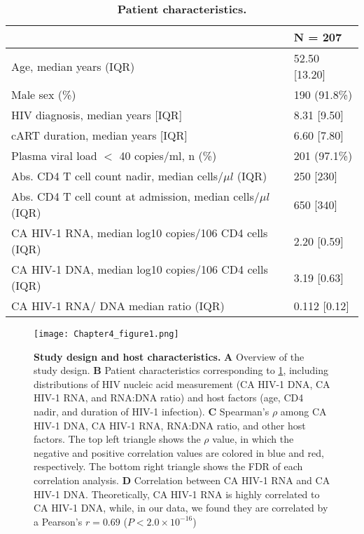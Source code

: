 \documentclass{book}
\begin{document}
\begin{refsection}
\begin{table}
  \begin{tabular}{ll}
    \hline
    & N = 207 \\
    \hline
    Age, median years (IQR) & 52.50 [13.20] \\
    Male sex (\%) & 190 (91.8\%) \\
    HIV diagnosis, median years [IQR] & 8.31 [9.50] \\
    cART duration, median years [IQR] & 6.60 [7.80] \\
    Plasma viral load $<$ 40 copies/ml, n (\%) & 201 (97.1\%) \\
    Abs. CD4 T cell count nadir, median cells/$\mu l$ (IQR) & 250 [230] \\
    Abs. CD4 T cell count at admission, median cells/$\mu l$ (IQR) & 650 [340] \\
    CA HIV-1 RNA, median log10 copies/106 CD4 cells (IQR) &  2.20 [0.59] \\
    CA HIV-1 DNA, median log10 copies/106 CD4 cells (IQR) & 3.19 [0.63] \\
    CA HIV-1 RNA/ DNA median ratio (IQR) & 0.112 [0.12] \\
    \hline
  \end{tabular}
  \caption{\label{tab:cht4tab1}
    \textbf{Patient characteristics.}
  }
\end{table}

\begin{figure}
  \texttt{[image: Chapter4\_figure1.png]}
  \caption{
    \label{fig:cht4fig1} \textbf{Study design and host characteristics.}
    \textbf{A} Overview of the study design.
    \textbf{B} Patient characteristics corresponding to \ref{tab:cht4tab1}, including distributions of HIV nucleic acid measurement (CA HIV-1 DNA, CA HIV-1 RNA, and RNA:DNA ratio) and host factors (age, CD4 nadir, and duration of HIV-1 infection).
    \textbf{C} Spearman’s $\rho$ among CA HIV-1 DNA, CA HIV-1 RNA, RNA:DNA ratio, and other host factors. The top left triangle shows the $\rho$ value, in which the negative and positive correlation values are colored in blue and red, respectively. The bottom right triangle shows the FDR of each correlation analysis.
    \textbf{D} Correlation between CA HIV-1 RNA and CA HIV-1 DNA. Theoretically, CA HIV-1 RNA is highly correlated to CA HIV-1 DNA, while, in our data, we found they are correlated by a Pearson’s $r = 0.69$ ($P < 2.0 \times 10^{-16}$)
  }
\end{figure}


\end{refsection}
\end{document}
